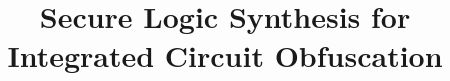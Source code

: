 \documentclass[conference,compsoc]{IEEEtran}
\begin{document}
\newcommand{\mvt}[1]{\vspace*{0.125in}\noindent\textbf{mvt: #1}\xspace}

%
\title{Secure Logic Synthesis for Integrated Circuit Obfuscation}





% 








\maketitle
\end{document}
